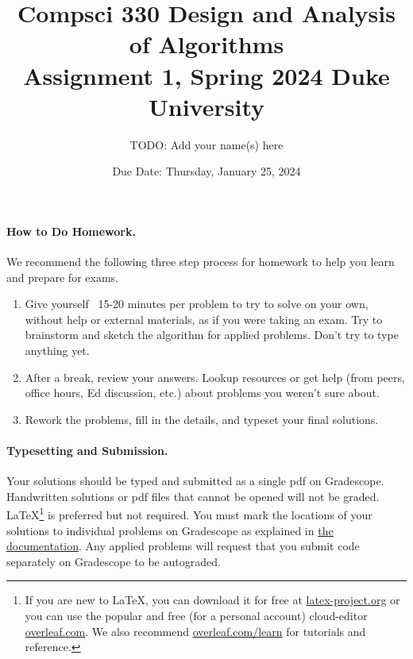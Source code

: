 \documentclass[11pt]{article}
\title{\vspace{-0.5in}Compsci 330 Design and Analysis of Algorithms \\Assignment 1, Spring 2024 Duke University}
\author{TODO: Add your name(s) here}
\date{Due Date: Thursday, January 25, 2024}
\begin{document}
\maketitle

\newcommand{\vsp}{\vspace{0.5em}}



\paragraph{How to Do Homework.} We recommend the following three step process for homework to help you learn and prepare for exams.
\begin{enumerate}
	\item Give yourself ~15-20 minutes per problem to try to solve on your own, without help or external materials, as if you were taking an exam. Try to brainstorm and sketch the algorithm for applied problems. Don't try to type anything yet.
	\item After a break, review your answers. Lookup resources or get help (from peers, office hours, Ed discussion, etc.) about problems you weren't sure about.
	\item Rework the problems, fill in the details, and typeset your final solutions.
\end{enumerate}

\paragraph{Typesetting and Submission.} Your solutions should be typed and submitted as a single pdf on Gradescope. Handwritten solutions or pdf files that cannot be opened will not be graded. \LaTeX \footnote{If you are new to \LaTeX, you can download it for free at \href{https://www.latex-project.org}{latex-project.org} or you can use the popular and free (for a personal account) cloud-editor \href{https://www.overleaf.com}{overleaf.com}. We also recommend \href{https://www.overleaf.com/learn}{overleaf.com/learn} for tutorials and reference.} is preferred but not required. %
You must mark the locations of your solutions to individual problems on Gradescope as explained in \href{https://help.gradescope.com/article/ccbpppziu9-student-submit-work#submitting_a_pdf}{the documentation}. Any applied problems will request that you submit code separately on Gradescope to be autograded. 
\end{document}
